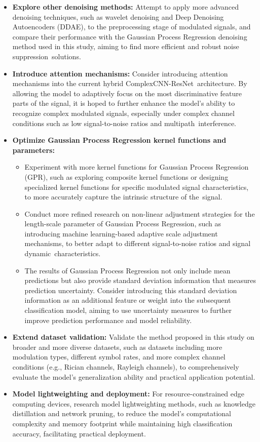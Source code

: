 \documentclass[conference]{IEEEtran}
\begin{document}
\begin{itemize}
    \item \textbf{Explore other denoising methods:} Attempt to apply more advanced denoising techniques, such as wavelet denoising and Deep Denoising Autoencoders (DDAE), to the preprocessing stage of modulated signals, and compare their performance with the Gaussian Process Regression denoising method used in this study, aiming to find more efficient and robust noise suppression~solutions.
    \item \textbf{Introduce attention mechanisms:} Consider introducing attention mechanisms into the current hybrid ComplexCNN-ResNet~architecture. By allowing the model to adaptively focus on the most discriminative feature parts of the signal, it is hoped to further enhance the model's ability to recognize complex modulated signals, especially under complex channel conditions such as low signal-to-noise ratios and multipath~interference.
    \item \textbf{Optimize Gaussian Process Regression kernel functions and parameters:}
    \begin{itemize}
        \item Experiment with more kernel functions for Gaussian Process Regression (GPR), such as exploring composite kernel functions or designing specialized kernel functions for specific modulated signal characteristics, to more accurately capture the intrinsic structure of the~signal.
        \item Conduct more refined research on non-linear adjustment strategies for the length-scale parameter of Gaussian Process Regression, such as introducing machine learning-based adaptive scale adjustment mechanisms, to better adapt to different signal-to-noise ratios and signal dynamic~characteristics.
        \item The results of Gaussian Process Regression not only include mean predictions but also provide standard deviation information that measures prediction uncertainty. Consider introducing this standard deviation information as an additional feature or weight into the subsequent classification model, aiming to use uncertainty measures to further improve prediction performance and model reliability.
    \end{itemize}
    \item \textbf{Extend dataset validation:} Validate the method proposed in this study on broader and more diverse datasets, such as datasets including more modulation types, different symbol rates, and more complex channel conditions (e.g., Rician channels, Rayleigh channels), to comprehensively evaluate the model's generalization ability and practical application potential.
    \item \textbf{Model lightweighting and deployment:} For resource-constrained edge computing devices, research model lightweighting methods, such as knowledge distillation and network pruning, to reduce the model's computational complexity and memory footprint while maintaining high classification accuracy, facilitating practical deployment.
\end{itemize}
\end{document}
